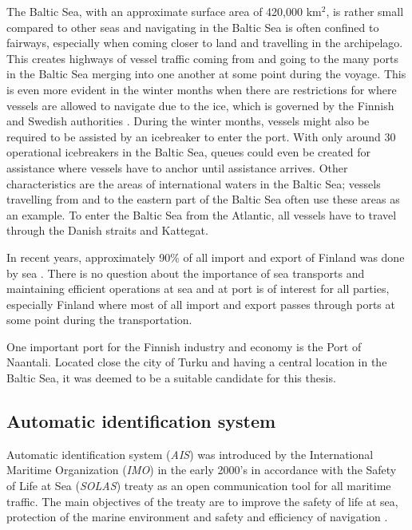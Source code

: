 \documentclass[../main.tex]{subfiles}
\begin{document}
The Baltic Sea, with an approximate surface area of 420,000 km$^2$, is rather small compared to other seas and navigating in the Baltic Sea is often confined to fairways, especially when coming closer to land and travelling in the archipelago. This creates highways of vessel traffic coming from and going to the many ports in the Baltic Sea merging into one another at some point during the voyage. This is even more evident in the winter months when there are restrictions for where vessels are allowed to navigate due to the ice, which is governed by the Finnish and Swedish authorities \cite{Goerlandt_2017}. During the winter months, vessels might also be required to be assisted by an icebreaker to enter the port. With only around 30 operational icebreakers in the Baltic Sea, queues could even be created for assistance where vessels have to anchor until assistance arrives. Other characteristics are the areas of international waters in the Baltic Sea; vessels travelling from and to the eastern part of the Baltic Sea often use these areas as an example. To enter the Baltic Sea from the Atlantic, all vessels have to travel through the Danish straits and Kattegat.

In recent years, approximately 90\% of all import and export of Finland was done by sea \cite{SVRY_2022}. There is no question about the importance of sea transports and maintaining efficient operations at sea and at port is of interest for all parties, especially Finland where most of all import and export passes through ports at some point during the transportation.

One important port for the Finnish industry and economy is the Port of Naantali. Located close the city of Turku and having a central location in the Baltic Sea, it was deemed to be a suitable candidate for this thesis.

\subsection{Automatic identification system}

Automatic identification system (\textit{AIS}) was introduced by the International Maritime Organization (\textit{IMO}) in the early 2000's in accordance with the Safety of Life at Sea (\textit{SOLAS}) treaty as an open communication tool for all maritime traffic. The main objectives of the treaty are to improve the safety of life at sea, protection of the marine environment and safety and efficiency of navigation \cite{IMO_2015}. 
\end{document}
